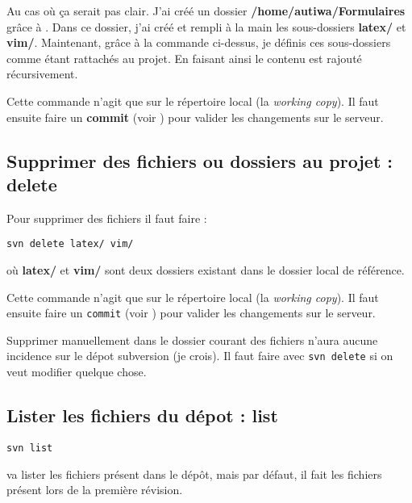 \documentclass[a4paper,twoside]{article}
\begin{document}
\begin{remarque}
Au cas où ça serait pas clair. J'ai créé un dossier \textbf{/home/autiwa/Formulaires} grâce à . Dans ce dossier, j'ai créé et rempli à la main les sous-dossiers \textbf{latex/} et \textbf{vim/}. Maintenant, grâce à la commande ci-dessus, je définis ces sous-dossiers comme étant rattachés au projet. En faisant ainsi le contenu est rajouté récursivement.
\end{remarque}

\begin{attention}
Cette commande n'agit que sur le répertoire local (la \emph{working copy}). Il faut ensuite faire un \textbf{commit} (voir ) pour valider les changements sur le serveur.
\end{attention}

\subsection{Supprimer des fichiers ou dossiers au projet : delete} 
Pour supprimer des fichiers il faut faire :
\begin{verbatim}
svn delete latex/ vim/ 
\end{verbatim}
où \textbf{latex/} et \textbf{vim/} sont deux dossiers existant dans le dossier local de référence. 

\begin{attention}
Cette commande n'agit que sur le répertoire local (la \emph{working copy}). Il faut ensuite faire un \texttt{commit} (voir ) pour valider les changements sur le serveur.
\end{attention}

\begin{remarque}
Supprimer manuellement dans le dossier courant des fichiers n'aura aucune incidence sur le dépot subversion (je crois). Il faut faire avec \texttt{svn delete} si on veut modifier quelque chose.
\end{remarque}

\subsection{Lister les fichiers du dépot : list} 
\begin{verbatim}
svn list
\end{verbatim}
va lister les fichiers présent dans le dépôt, mais par défaut, il fait les fichiers présent lors de la première révision. 
\end{document}
